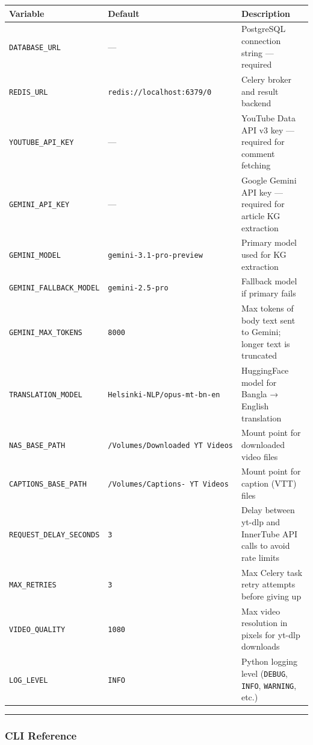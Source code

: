 \documentclass[
]{article}
\newcounter{none} %
\begin{document}
{\def\LTcaptype{none} %
\small
\setlength{\tabcolsep}{4pt}
\begin{longtable}[]{@{}lll@{}}
\toprule\noalign{}
Variable & Default & Description \\
\midrule\noalign{}
\endhead
\bottomrule\noalign{}
\endlastfoot
\texttt{DATABASE\_URL} & --- & PostgreSQL connection string ---
required \\
\texttt{REDIS\_URL} & \texttt{redis://localhost:6379/0} & Celery broker
and result backend \\
\texttt{YOUTUBE\_API\_KEY} & --- & YouTube Data API v3 key --- required
for comment fetching \\
\texttt{GEMINI\_API\_KEY} & --- & Google Gemini API key --- required for
article KG extraction \\
\texttt{GEMINI\_MODEL} & \texttt{gemini-3.1-pro-preview} & Primary model
used for KG extraction \\
\texttt{GEMINI\_FALLBACK\_MODEL} & \texttt{gemini-2.5-pro} & Fallback
model if primary fails \\
\texttt{GEMINI\_MAX\_TOKENS} & \texttt{8000} & Max tokens of body text
sent to Gemini; longer text is truncated \\
\texttt{TRANSLATION\_MODEL} & \texttt{Helsinki-NLP/opus-mt-bn-en} &
HuggingFace model for Bangla → English translation \\
\texttt{NAS\_BASE\_PATH} & \texttt{/Volumes/Downloaded\ YT\ Videos} &
Mount point for downloaded video files \\
\texttt{CAPTIONS\_BASE\_PATH} & \texttt{/Volumes/Captions-\ YT\ Videos}
& Mount point for caption (VTT) files \\
\texttt{REQUEST\_DELAY\_SECONDS} & \texttt{3} & Delay between yt-dlp and
InnerTube API calls to avoid rate limits \\
\texttt{MAX\_RETRIES} & \texttt{3} & Max Celery task retry attempts
before giving up \\
\texttt{VIDEO\_QUALITY} & \texttt{1080} & Max video resolution in pixels
for yt-dlp downloads \\
\texttt{LOG\_LEVEL} & \texttt{INFO} & Python logging level
(\texttt{DEBUG}, \texttt{INFO}, \texttt{WARNING}, etc.) \\
\end{longtable}
}

\begin{center}\rule{0.5\linewidth}{0.5pt}\end{center}

\subsubsection{CLI Reference}\label{cli-reference}
\end{document}
